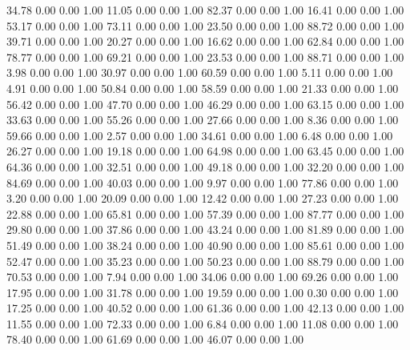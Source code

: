    34.78   0.00   0.00   1.00
   11.05   0.00   0.00   1.00
   82.37   0.00   0.00   1.00
   16.41   0.00   0.00   1.00
   53.17   0.00   0.00   1.00
   73.11   0.00   0.00   1.00
   23.50   0.00   0.00   1.00
   88.72   0.00   0.00   1.00
   39.71   0.00   0.00   1.00
   20.27   0.00   0.00   1.00
   16.62   0.00   0.00   1.00
   62.84   0.00   0.00   1.00
   78.77   0.00   0.00   1.00
   69.21   0.00   0.00   1.00
   23.53   0.00   0.00   1.00
   88.71   0.00   0.00   1.00
    3.98   0.00   0.00   1.00
   30.97   0.00   0.00   1.00
   60.59   0.00   0.00   1.00
    5.11   0.00   0.00   1.00
    4.91   0.00   0.00   1.00
   50.84   0.00   0.00   1.00
   58.59   0.00   0.00   1.00
   21.33   0.00   0.00   1.00
   56.42   0.00   0.00   1.00
   47.70   0.00   0.00   1.00
   46.29   0.00   0.00   1.00
   63.15   0.00   0.00   1.00
   33.63   0.00   0.00   1.00
   55.26   0.00   0.00   1.00
   27.66   0.00   0.00   1.00
    8.36   0.00   0.00   1.00
   59.66   0.00   0.00   1.00
    2.57   0.00   0.00   1.00
   34.61   0.00   0.00   1.00
    6.48   0.00   0.00   1.00
   26.27   0.00   0.00   1.00
   19.18   0.00   0.00   1.00
   64.98   0.00   0.00   1.00
   63.45   0.00   0.00   1.00
   64.36   0.00   0.00   1.00
   32.51   0.00   0.00   1.00
   49.18   0.00   0.00   1.00
   32.20   0.00   0.00   1.00
   84.69   0.00   0.00   1.00
   40.03   0.00   0.00   1.00
    9.97   0.00   0.00   1.00
   77.86   0.00   0.00   1.00
    3.20   0.00   0.00   1.00
   20.09   0.00   0.00   1.00
   12.42   0.00   0.00   1.00
   27.23   0.00   0.00   1.00
   22.88   0.00   0.00   1.00
   65.81   0.00   0.00   1.00
   57.39   0.00   0.00   1.00
   87.77   0.00   0.00   1.00
   29.80   0.00   0.00   1.00
   37.86   0.00   0.00   1.00
   43.24   0.00   0.00   1.00
   81.89   0.00   0.00   1.00
   51.49   0.00   0.00   1.00
   38.24   0.00   0.00   1.00
   40.90   0.00   0.00   1.00
   85.61   0.00   0.00   1.00
   52.47   0.00   0.00   1.00
   35.23   0.00   0.00   1.00
   50.23   0.00   0.00   1.00
   88.79   0.00   0.00   1.00
   70.53   0.00   0.00   1.00
    7.94   0.00   0.00   1.00
   34.06   0.00   0.00   1.00
   69.26   0.00   0.00   1.00
   17.95   0.00   0.00   1.00
   31.78   0.00   0.00   1.00
   19.59   0.00   0.00   1.00
    0.30   0.00   0.00   1.00
   17.25   0.00   0.00   1.00
   40.52   0.00   0.00   1.00
   61.36   0.00   0.00   1.00
   42.13   0.00   0.00   1.00
   11.55   0.00   0.00   1.00
   72.33   0.00   0.00   1.00
    6.84   0.00   0.00   1.00
   11.08   0.00   0.00   1.00
   78.40   0.00   0.00   1.00
   61.69   0.00   0.00   1.00
   46.07   0.00   0.00   1.00
